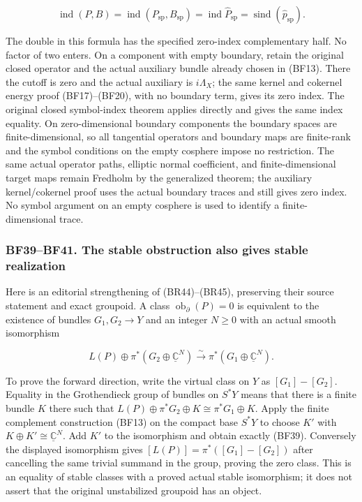 \documentclass[
  11pt,
]{article}
\begin{document}
\[
 \operatorname{ind}(P,B)
 =\operatorname{ind}(P_{\mathrm{sp}},B_{\mathrm{sp}})
 =\operatorname{ind}\widehat P_{\mathrm{sp}}
 =\operatorname{sind}(\widehat p_{\mathrm{sp}}).
 \tag{BF38}
\]

The double in this formula has the specified zero-index complementary
half. No factor of two enters. On a component with empty boundary,
retain the original closed operator and the actual auxiliary bundle
already chosen in (BF13). There the cutoff is zero and the actual
auxiliary is \(i\Lambda_X\); the same kernel and cokernel energy proof
(BF17)--(BF20), with no boundary term, gives its zero index. The
original closed symbol-index theorem applies directly and gives the same
index equality. On zero-dimensional boundary components the boundary
spaces are finite-dimensional, so all tangential operators and boundary
maps are finite-rank and the symbol conditions on the empty cosphere
impose no restriction. The same actual operator paths, elliptic normal
coefficient, and finite-dimensional target maps remain Fredholm by the
generalized theorem; the auxiliary kernel/cokernel proof uses the actual
boundary traces and still gives zero index. No symbol argument on an
empty cosphere is used to identify a finite-dimensional trace.

\subsubsection{BF39--BF41. The stable obstruction also gives stable
realization}\label{bf39bf41.-the-stable-obstruction-also-gives-stable-realization}

Here is an editorial strengthening of (BR44)--(BR45), preserving their
source statement and exact groupoid. A class
\(\operatorname{ob}_{\partial}(P)=0\) is equivalent to the existence of
bundles \(G_1,G_2\to Y\) and an integer \(N\ge0\) with an actual smooth
isomorphism

\[
 L(P)\oplus\pi^*(G_2\oplus\underline{\mathbb C}^{N})
       \xrightarrow{\sim}
       \pi^*(G_1\oplus\underline{\mathbb C}^{N}).
 \tag{BF39}
\]

To prove the forward direction, write the virtual class on \(Y\) as
\([G_1]-[G_2]\). Equality in the Grothendieck group of bundles on
\(S^*Y\) means that there is a finite bundle \(K\) there such that
\(L(P)\oplus\pi^*G_2\oplus K\cong\pi^*G_1\oplus K\). Apply the finite
complement construction (BF13) on the compact base \(S^*Y\) to choose
\(K'\) with \(K\oplus K'\cong\underline{\mathbb C}^{N}\). Add \(K'\) to
the isomorphism and obtain exactly (BF39). Conversely the displayed
isomorphism gives \([L(P)]=\pi^*([G_1]-[G_2])\) after cancelling the
same trivial summand in the group, proving the zero class. This is an
equality of stable classes with a proved actual stable isomorphism; it
does not assert that the original unstabilized groupoid has an object.
\end{document}
